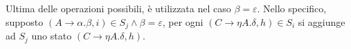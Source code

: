 \documentclass{subfiles}
\begin{document}
Ultima delle operazioni possibili, è utilizzata nel caso \(\beta = \varepsilon\).
Nello specifico, supposto \((A \to \alpha . \beta, i) \in S_{j} \land \beta = \varepsilon\), per ogni \((C \to \eta A. \delta, h) \in S_{i}\)
si aggiunge ad \(S_{j}\) uno stato \((C \to \eta A. \delta, h)\).
\end{document}
